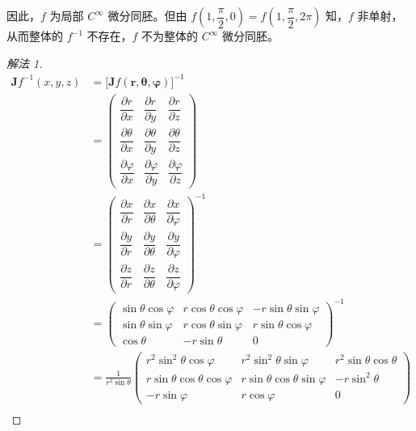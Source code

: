 \begin{example}
因此，$f$ 为局部 $C^{\infty}$ 微分同胚。但由 $f\left(1,\dfrac{\pi}{2},0\right) = f\left(1,\dfrac{\pi}{2},2\pi\right)$ 知，$f$ 非单射，从而整体的 $f^{-1}$ 不存在，$f$ 不为整体的 $C^{\infty}$ 微分同胚。
\end{example}

\begin{proof}[解法 1]
\begin{align*}
  \boldsymbol{J}f^{-1}(x,y,z) &= \bigl[\boldsymbol{J}f(\boldsymbol{r},\boldsymbol{\theta},\boldsymbol{\varphi})\bigr]^{-1} \\
  &= \begin{pmatrix} \dfrac{\partial r}{\partial x} & \dfrac{\partial r}{\partial y} & \dfrac{\partial r}{\partial z} \\[6pt] \dfrac{\partial\theta}{\partial x} & \dfrac{\partial\theta}{\partial y} & \dfrac{\partial\theta}{\partial z} \\[6pt] \dfrac{\partial\varphi}{\partial x} & \dfrac{\partial\varphi}{\partial y} & \dfrac{\partial\varphi}{\partial z} \end{pmatrix} \\
  &= \begin{pmatrix} \dfrac{\partial x}{\partial r} & \dfrac{\partial x}{\partial\theta} & \dfrac{\partial x}{\partial\varphi} \\[6pt] \dfrac{\partial y}{\partial r} & \dfrac{\partial y}{\partial\theta} & \dfrac{\partial y}{\partial\varphi} \\[6pt] \dfrac{\partial z}{\partial r} & \dfrac{\partial z}{\partial\theta} & \dfrac{\partial z}{\partial\varphi} \end{pmatrix}^{-1} \\
  &= \begin{pmatrix} \sin\theta\cos\varphi & r\cos\theta\cos\varphi & -r\sin\theta\sin\varphi \\ \sin\theta\sin\varphi & r\cos\theta\sin\varphi & r\sin\theta\cos\varphi \\ \cos\theta & -r\sin\theta & 0 \end{pmatrix}^{-1} \\
  &= \frac{1}{r^{2}\sin\theta}\begin{pmatrix} r^{2}\sin^{2}\theta\cos\varphi & r^{2}\sin^{2}\theta\sin\varphi & r^{2}\sin\theta\cos\theta \\ r\sin\theta\cos\theta\cos\varphi & r\sin\theta\cos\theta\sin\varphi & -r\sin^{2}\theta \\ -r\sin\varphi & r\cos\varphi & 0 \end{pmatrix} \\

\end{align*}
\end{proof}
